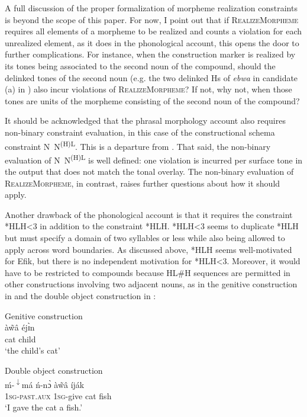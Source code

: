 \documentclass[output=paper]{langscibook}
\begin{document}
A full discussion of the proper formalization of morpheme realization constraints is beyond the scope of this paper. For now, I point out that if \textsc{RealizeMorpheme} requires all elements of a morpheme to be realized and counts a violation for each unrealized element, as it does in the phonological account, this opens the door to further complications. For instance, when the construction marker is realized by its tones being associated to the second noun of the compound, should the delinked tones of the second noun (e.g. the two delinked Hs of \textit{ebwa} in candidate (a) in ) also incur violations of \textsc{RealizeMorpheme}? If not, why not, when those tones are units of the morpheme consisting of the second noun of the compound? 

It should be acknowledged that the phrasal morphology account also requires non-binary constraint evaluation, in this case of the constructional schema constraint N~N\textsuperscript{(H)L}. This is a departure from \citet{McPherson2014}. That said, the non-binary evaluation of N~N\textsuperscript{(H)L} is well defined: one violation is incurred per surface tone in the output that does not match the tonal overlay. The non-binary evaluation of \textsc{RealizeMorpheme}, in contrast, raises further questions about how it should apply. 

Another drawback of the phonological account is that it requires the constraint *HLH<3 in addition to the constraint *HLH. *HLH<3 seems to duplicate *HLH but must specify a domain of two syllables or less while also being allowed to apply across word boundaries. As discussed above, *HLH seems well-motivated for Efik, but there is no independent motivation for *HLH<3. Moreover, it would have to be restricted to compounds because HL\#H sequences are permitted in other constructions involving two adjacent nouns, as in the genitive construction in  and the double object construction in : 


\ea \label{ex:glewwe:6}
Genitive construction\\
\gll \textup{à\~{w}â} éjɪ̀n\\
     cat child\\
\glt ‘the child’s cat’  
\z

\ea\label{ex:glewwe:7} 
Double object construction\\
\gll \textup{ḿ-}\textup{\textsuperscript{$\downarrow$}}\textup{má}     \textup{ń-nɔ̀} à\~{w}â   íják \\
     \textsc{1sg-past.aux}  \textsc{1sg-}\textup{give}   \textup{cat}  {fish}\\
\glt ‘I gave the cat a fish.’ 
\z
\end{document}
